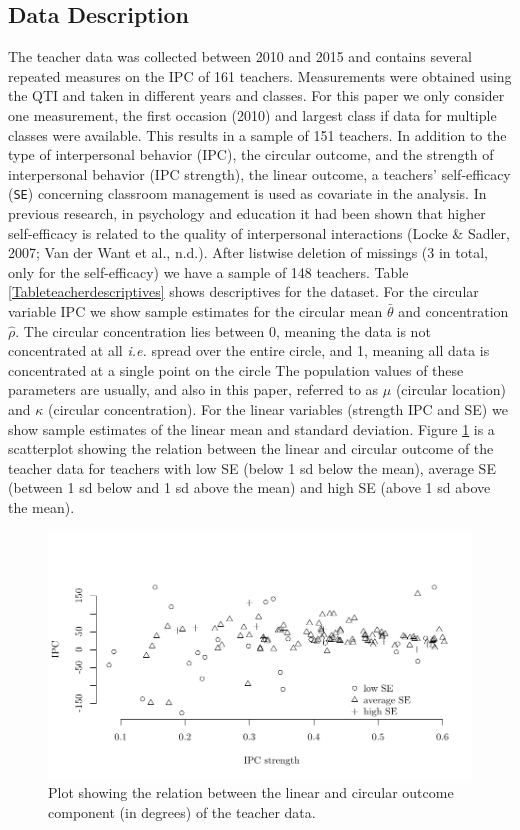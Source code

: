 \documentclass[man]{apa6}
\DeclareRobustCommand{\VANDER}[3]{#2}
\theoremstyle{definition}
\theoremstyle{definition}
\theoremstyle{definition}
\theoremstyle{remark}
\begin{document}
\subsection{Data Description}\label{DataDescriptives}

The teacher data was collected between 2010 and 2015 and contains
several repeated measures on the IPC of 161 teachers. Measurements were
obtained using the QTI and taken in different years and classes. For
this paper we only consider one measurement, the first occasion (2010)
and largest class if data for multiple classes were available. This
results in a sample of 151 teachers. In addition to the type of
interpersonal behavior (IPC), the circular outcome, and the strength of
interpersonal behavior (IPC strength), the linear outcome, a teachers'
self-efficacy (\verb|SE|) concerning classroom management is used as
covariate in the analysis. In previous research, in psychology and
education it had been shown that higher self-efficacy is related to the
quality of interpersonal interactions (Locke \& Sadler, 2007;
\VANDER{Want}{Van der}{van der} Want et al., n.d.). After listwise
deletion of missings (\(3\) in total, only for the self-efficacy) we
have a sample of 148 teachers. Table \ref{Tableteacherdescriptives}
shows descriptives for the dataset. For the circular variable IPC we
show sample estimates for the circular mean \(\bar{\theta}\) and
concentration \(\hat{\rho}\). The circular concentration lies between 0,
meaning the data is not concentrated at all \emph{i.e.} spread over the
entire circle, and 1, meaning all data is concentrated at a single point
on the circle The population values of these parameters are usually, and
also in this paper, referred to as \(\mu\) (circular location) and
\(\kappa\) (circular concentration). For the linear variables (strength
IPC and SE) we show sample estimates of the linear mean and standard
deviation. Figure \ref{dataplot} is a scatterplot showing the relation
between the linear and circular outcome of the teacher data for teachers
with low SE (below 1 sd below the mean), average SE (between 1 sd below
and 1 sd above the mean) and high SE (above 1 sd above the mean).

\begin{figure}
\centering
\includegraphics[width = \textwidth]{Plots/dataplot.pdf}
\caption{Plot showing the relation between the linear and circular outcome component (in degrees) of the teacher data.}
\label{dataplot}
\end{figure}
\end{document}

